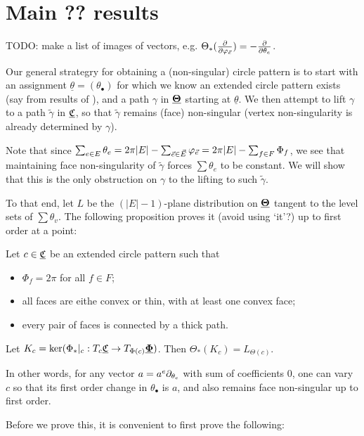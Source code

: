 \section{Main ?? results}


TODO: make a list of images of vectors, e.g.
$\Theta_*({\frac{\partial}{\partial \varphi_{\vec{e}}}}) = -{\frac{\partial}{\partial \theta_e}}$.


Our general strategry for obtaining a (non-singular) circle pattern
is to start with an assignment $\underline{\theta} = (\theta_\bullet)$
for which we know an extended circle pattern exists
(say from results of ),
and a path $\gamma$ in ${\underline{\mathbf{\Theta}}}$ starting at $\underline{\theta}$.
We then attempt to lift $\gamma$ to a path $\tilde{\gamma}$ in ${\underline{\mathfrak{C}}}$,
so that $\tilde{\gamma}$ remains (face) non-singular
(vertex non-singularity is already determined by $\gamma$).

Note that since $\sum_{e\in E} \theta_e
= 2\pi |E| - \sum_{\vec{e} \in \vec{E}} \varphi_{\vec{e}}
= 2\pi |E| - \sum_{f\in F} \Phi_f$,
we see that maintaining face non-singularity of $\tilde{\gamma}$
forces $\sum \theta_e$ to be constant.
We will show that this is the only obstruction on $\gamma$
to the lifting to such $\tilde{\gamma}$.

To that end, let $L$ be the $(|E|-1)$-plane distribution on ${\underline{\mathbf{\Theta}}}$
tangent to the level sets of $\sum \theta_v$.
The following proposition proves it (avoid using `it'?) up to first order at a point:


\begin{proposition}
\label{p:point_lift}
Let $c \in {\underline{\mathfrak{C}}}$ be an extended circle pattern such that
\begin{itemize}
	\item $\Phi_f = 2\pi$ for all $f\in F$;
	\item all faces are eithe convex or thin,
		with at least one convex face;
	\item every pair of faces is connected by a thick path.
\end{itemize}
Let $K_c = \ker (\Phi_*|_c : T_c {\underline{\mathfrak{C}}} \to T_{\Phi(c)} {\underline{\mathbf{\Phi}}})$.
Then $\Theta_*(K_c) = L_{\Theta(c)}$.

In other words, for any vector $a = a^e \partial_{\theta_e}$
with sum of coefficients 0, one can vary $c$ so that its
first order change in $\theta_\bullet$ is $a$,
and also remains face non-singular up to first order.
\end{proposition}


Before we prove this, it is convenient to first prove the following:

